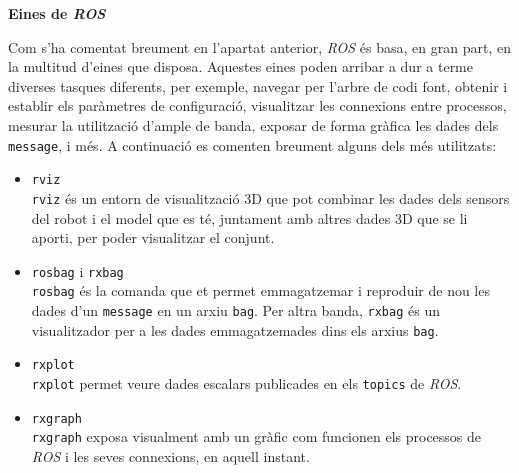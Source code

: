 \documentclass[12pt,a4paper,final,twoside]{article}
\begin{document}
\vspace{20pt}
\textbf{Eines de \textit{ROS}}

Com s'ha comentat breument en l'apartat anterior, \textit{ROS} és basa, en gran part, en la multitud d'eines que disposa. Aquestes eines poden arribar a dur a terme diverses tasques diferents, per exemple, navegar per l'arbre de codi font, obtenir i establir els paràmetres de configuració, visualitzar les connexions entre processos, mesurar la utilització d'ample de banda, exposar de forma gràfica les dades dels \texttt{message}, i més. A continuació es comenten breument alguns dels més utilitzats:
\begin{itemize}
\item \texttt{rviz}\\
\texttt{rviz} és un entorn de visualització 3D que pot combinar les dades dels sensors del robot i el model que es té, juntament amb altres dades 3D que se li aporti, per poder visualitzar el conjunt.

\item \texttt{rosbag} i \texttt{rxbag}\\
\texttt{rosbag} és la comanda que et permet emmagatzemar i reproduir de nou les dades d'un \texttt{message} en un arxiu \texttt{bag}. Per altra banda, \texttt{rxbag} és un visualitzador per a les dades emmagatzemades dins els arxius \texttt{bag}.

\item \texttt{rxplot}\\
\texttt{rxplot} permet veure dades escalars publicades en els \texttt{topics} de \textit{ROS}.

\item \texttt{rxgraph}\\
\texttt{rxgraph} exposa visualment amb un gràfic com funcionen els processos de \textit{ROS} i les seves connexions, en aquell instant.

\end{itemize}


\end{document}
